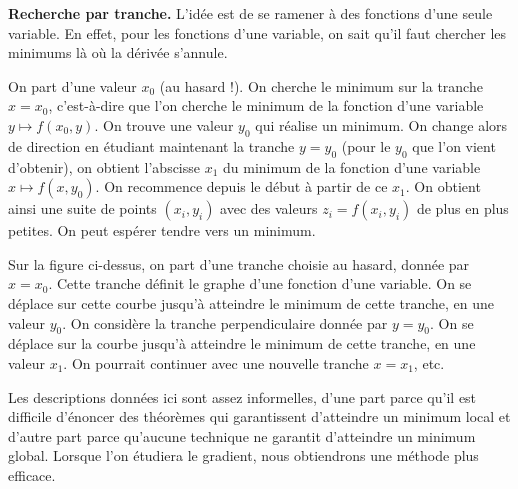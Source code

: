 \documentclass[11pt,class=report,crop=false]{standalone}
\begin{document}
\bigskip

\textbf{Recherche par tranche.} 
L'idée est de se ramener à des fonctions d'une seule variable. En effet, 
pour les fonctions d'une variable, on sait qu'il faut chercher les minimums là où la dérivée s'annule.

On part d'une valeur $x_0$ (au hasard !). On cherche le minimum sur la tranche $x=x_0$, c'est-à-dire que l'on cherche le minimum de la fonction d'une variable $y \mapsto f(x_0,y)$. On trouve une valeur $y_0$ qui réalise un minimum. On change alors de direction en étudiant maintenant la tranche $y=y_0$ (pour le $y_0$ que l'on vient d'obtenir), on obtient l'abscisse $x_1$ du minimum de la fonction d'une variable $x \mapsto f(x,y_0)$. On recommence depuis le début à partir de ce $x_1$. On obtient ainsi une suite de points $(x_i,y_i)$ avec des valeurs $z_i=f(x_i,y_i)$ de plus en plus petites. On peut espérer tendre vers un minimum. %


   
Sur la figure ci-dessus, on part d'une tranche choisie au hasard, donnée par $x=x_0$. Cette tranche définit le graphe d'une fonction d'une variable. On se déplace sur cette courbe jusqu'à atteindre le minimum de cette tranche, en une valeur $y_0$. On considère la tranche perpendiculaire donnée par $y=y_0$. On se déplace sur la courbe jusqu'à atteindre le minimum de cette tranche, en une valeur $x_1$. On pourrait continuer avec une nouvelle tranche $x=x_1$, etc.

\bigskip

Les descriptions données ici sont assez informelles, d'une part parce qu'il est difficile d'énoncer des théorèmes qui garantissent d'atteindre un minimum local et d'autre part parce qu'aucune technique ne garantit d'atteindre un minimum global. Lorsque l'on étudiera le gradient, nous obtiendrons une méthode plus efficace.
\end{document}
